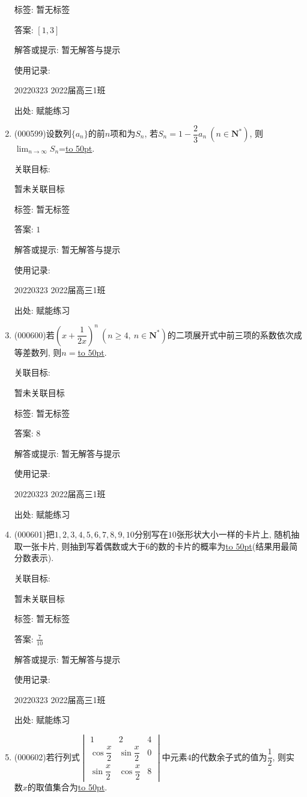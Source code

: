 \documentclass[10pt,a4paper]{article}
\newcommand{\blank}[1]{\underline{\hbox to #1pt{}}}
\begin{document}
\begin{enumerate}[1.]
标签: 暂无标签

答案: $[1,3]$

解答或提示: 暂无解答与提示

使用记录:

20220323	2022届高三1班	


出处: 赋能练习
\item { (000599)}设数列$\{a_n\}$的前$n$项和为$S_n$, 若$S_n=1-\dfrac23{a_n} \ (n\in \mathbf{N}^*)$, 则$\displaystyle\lim_{n\to\infty}S_n$=\blank{50}.


关联目标:

暂未关联目标



标签: 暂无标签

答案: $1$

解答或提示: 暂无解答与提示

使用记录:

20220323	2022届高三1班	


出处: 赋能练习
\item { (000600)}若$(x+\dfrac1{2x})^n \ (n\ge 4, \ n\in \mathbf{N}^*)$的二项展开式中前三项的系数依次成等差数列, 则$n=$\blank{50}.


关联目标:

暂未关联目标



标签: 暂无标签

答案: $8$

解答或提示: 暂无解答与提示

使用记录:

20220323	2022届高三1班	


出处: 赋能练习
\item { (000601)}把$1,2,3,4,5,6,7,8,9,10$分别写在$10$张形状大小一样的卡片上, 随机抽取一张卡片, 则抽到写着偶数或大于$6$的数的卡片的概率为\blank{50}(结果用最简分数表示).


关联目标:

暂未关联目标



标签: 暂无标签

答案: $\frac 7{10}$

解答或提示: 暂无解答与提示

使用记录:

20220323	2022届高三1班	


出处: 赋能练习
\item { (000602)}若行列式$\begin{vmatrix} 1 & 2 & 4 \\ \cos \dfrac x2 & \sin \dfrac x2 & 0 \\ \sin \dfrac x2 & \cos \dfrac x2 & 8 \end{vmatrix}$中元素$4$的代数余子式的值为$\dfrac12$, 则实数$x$的取值集合为\blank{50}.



\end{enumerate}
\end{document}

